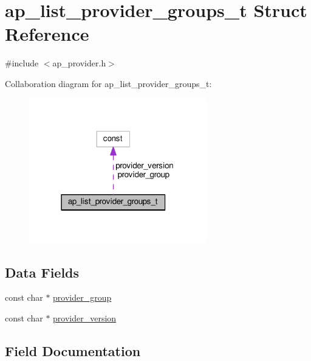 \hypertarget{structap__list__provider__groups__t}{}\section{ap\+\_\+list\+\_\+provider\+\_\+groups\+\_\+t Struct Reference}
\label{structap__list__provider__groups__t}


{\ttfamily \#include $<$ap\+\_\+provider.\+h$>$}



Collaboration diagram for ap\+\_\+list\+\_\+provider\+\_\+groups\+\_\+t\+:
\nopagebreak
\begin{figure}[H]
\begin{center}
\leavevmode
\includegraphics[width=219pt]{structap__list__provider__groups__t__coll__graph}
\end{center}
\end{figure}
\subsection*{Data Fields}
\begin{DoxyCompactItemize}
\item 
const char $\ast$ \hyperlink{structap__list__provider__groups__t_a2979467749225ed6e657db303eeaeb66}{provider\+\_\+group}
\item 
const char $\ast$ \hyperlink{structap__list__provider__groups__t_aa116a4ece1c406a370fadd0c94f84cf8}{provider\+\_\+version}
\end{DoxyCompactItemize}


\subsection{Field Documentation}
